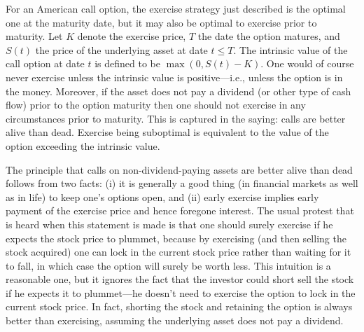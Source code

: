 For an American call option, the exercise strategy just described is the optimal one at the maturity date, but it may also be optimal to exercise prior to maturity.    Let $K$ denote the exercise price, $T$ the date the option matures, and $S(t)$ the price of the underlying asset at date $t \leq T$.  The intrinsic value  of the call option at date $t$ is defined to be $\max(0,S(t)-K)$.  One would of course never exercise unless the intrinsic value is positive---i.e., unless the option is in the money.  Moreover, if the asset does not pay a dividend (or other type of cash flow) prior to the option maturity then one should not exercise in any circumstances prior to maturity.  This is captured in the saying:  calls are better alive than dead.  Exercise being suboptimal is equivalent  to the value of the option exceeding the intrinsic value.

The principle that calls on non-dividend-paying assets are better alive than dead follows from two facts: (i) it is generally a good thing (in financial markets as well as in life) to keep one's options open, and (ii) early exercise implies early payment of the exercise price and hence foregone interest.  The usual protest that is heard when this statement is made is that one should surely exercise if he expects the stock price to plummet, because by exercising (and then selling the stock acquired) one can lock in the current stock price rather than waiting for it to fall, in which case the option will surely be worth less.  This intuition is a reasonable one, but it ignores the fact that the investor could short sell the stock if he expects it to plummet---he doesn't need to exercise the option to lock in the current stock price.  In fact, shorting the stock and retaining the option is always better than exercising, assuming the underlying asset does not pay a dividend.  

